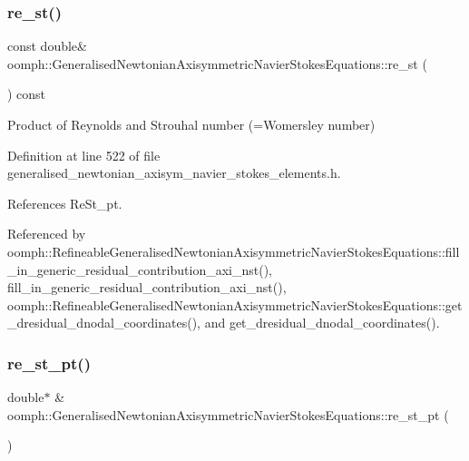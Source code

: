 \subsubsection{\texorpdfstring{re\+\_\+st()}{re\_st()}}
{\footnotesize\ttfamily const double\& oomph\+::\+Generalised\+Newtonian\+Axisymmetric\+Navier\+Stokes\+Equations\+::re\+\_\+st (\begin{DoxyParamCaption}{ }\end{DoxyParamCaption}) const\hspace{0.3cm}{\ttfamily [inline]}}



Product of Reynolds and Strouhal number (=Womersley number) 



Definition at line 522 of file generalised\+\_\+newtonian\+\_\+axisym\+\_\+navier\+\_\+stokes\+\_\+elements.\+h.



References Re\+St\+\_\+pt.



Referenced by oomph\+::\+Refineable\+Generalised\+Newtonian\+Axisymmetric\+Navier\+Stokes\+Equations\+::fill\+\_\+in\+\_\+generic\+\_\+residual\+\_\+contribution\+\_\+axi\+\_\+nst(), fill\+\_\+in\+\_\+generic\+\_\+residual\+\_\+contribution\+\_\+axi\+\_\+nst(), oomph\+::\+Refineable\+Generalised\+Newtonian\+Axisymmetric\+Navier\+Stokes\+Equations\+::get\+\_\+dresidual\+\_\+dnodal\+\_\+coordinates(), and get\+\_\+dresidual\+\_\+dnodal\+\_\+coordinates().

\mbox{\label{classoomph_1_1GeneralisedNewtonianAxisymmetricNavierStokesEquations_a39d6b323135260e4b332a6743d37d201}} 
\subsubsection{\texorpdfstring{re\+\_\+st\+\_\+pt()}{re\_st\_pt()}}
{\footnotesize\ttfamily double$\ast$ \& oomph\+::\+Generalised\+Newtonian\+Axisymmetric\+Navier\+Stokes\+Equations\+::re\+\_\+st\+\_\+pt (\begin{DoxyParamCaption}{ }\end{DoxyParamCaption})\hspace{0.3cm}{\ttfamily [inline]}}



